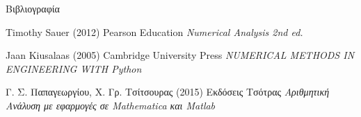 \begin{frame}{Βιβλιογραφία}
    \footnotesize{
        \begin{thebibliography}{3}
             Timothy Sauer (2012)
            \newblock Pearson Education
            \newblock \emph{Numerical Analysis 2nd ed.}

             Jaan Kiusalaas (2005)
            \newblock Cambridge University Press
            \newblock \emph{NUMERICAL METHODS IN ENGINEERING WITH Python}

             Γ. Σ. Παπαγεωργίου, Χ. Γρ. Τσίτσουρας (2015)
            \newblock Εκδόσεις Τσότρας
            \newblock \emph{Αριθμητική Ανάλυση με εφαρμογές σε Mathematica και Matlab}
        \end{thebibliography}
    }
\end{frame}